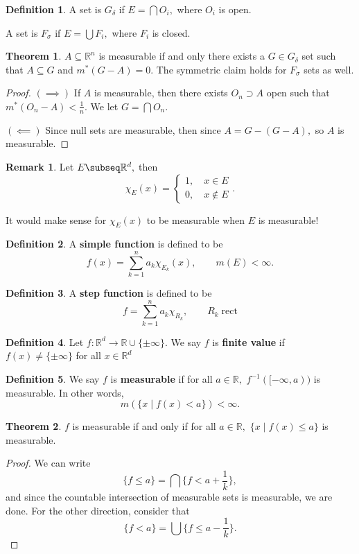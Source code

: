 \documentclass[10pt, oneside]{article}
\newcommand{\bbR}{\mathbb{R}}
\theoremstyle{definition}
\newtheorem{thm}{Theorem}
\newtheorem{defn}{Definition}
\newtheorem{rem}{Remark}
\begin{document}
\begin{defn}
    A set is $G_\delta$ if $E = \bigcap O_i,$ where $O_i$ is open.

    A set is $F_\sigma$ if $E = \bigcup F_i,$ where $F_i$ is closed.
\end{defn}
\begin{thm}
    $A\subseteq \bbR^n$ is measurable if and only there exists a $G \in G_\delta$ set such that $A\subseteq G$ and $m^\ast(G - A) = 0.$ The symmetric claim holds for $F_\sigma$ sets as well.
\end{thm}
\begin{proof}
    $(\implies)$ If $A$ is measurable, then there exists $O_n \supset A$ open such that $m^\ast(O_n - A)< \frac{1}{n}.$ We let $G = \bigcap O_n.$ 

    $(\impliedby)$ Since null sets are measurable, then since $A = G - (G - A),$ so $A$ is measurable.
\end{proof}

\begin{rem}
    Let $E\subseq \bbR^d,$ then 
    \[\chi_E(x) = \begin{cases}
        1, \quad x\in E\\
        0, \quad x\notin E
    \end{cases}.\]
\end{rem}
It would make sense for $\chi_E(x)$ to be measurable when $E$ is measurable!
\begin{defn}
    A \textbf{simple function} is defined to be 
    \[f(x) = \sum_{k=1}^n a_k \chi_{E_k}(x), \qquad m(E) < \infty.\]
\end{defn}
\begin{defn}
    A \textbf{step function} is defined to be 
    \[f = \sum_{k=1}^n a_k \chi_{R_k}, \qquad R_k \; \text{rect}\]
\end{defn}
\begin{defn}
Let $f: \bbR^d \to \bbR \cup \{\pm \infty\}.$ We say $f$ is \textbf{finite value} if $f(x) \neq \{\pm \infty\}$ for all $x\in \bbR^d$    
\end{defn}

\begin{defn}
    We say $f$ is \textbf{measurable} if for all $a\in \bbR,$ $f^{-1}([-\infty, a))$ is measurable. In other words, 
    \[m(\{x \; | \; f(x)< a\})< \infty.\]
\end{defn}

\begin{thm}
    $f$ is measurable if and only if for all $a\in \bbR,$ $\{x \; | \; f(x)\leq a\}$ is measurable.
\end{thm}
\begin{proof}
    We can write 
    \[\{f \leq a\} = \bigcap \{ f < a + \frac{1}{k}\},\] and since the countable intersection of measurable sets is measurable, we are done. For the other direction, consider that
    \[\{f < a\} = \bigcup \{f \leq a - \frac{1}{k}\}.\]
\end{proof}
\end{document}
